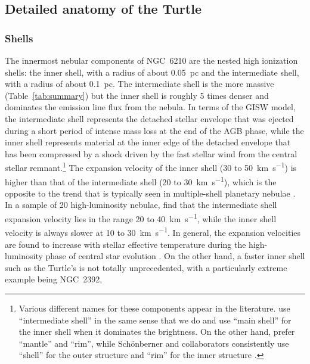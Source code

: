 \documentclass[useAMS, usenatbib]{mnras}
\begin{document}
\subsection{Detailed anatomy of the Turtle}
\label{sec:anatomy}

\subsubsection{Shells}
\label{sec:shells}


The innermost nebular components of NGC~6210 are the nested high ionization shells:
the inner shell, with a radius of about \SI{0.05}{pc}
and the intermediate shell, with a radius of about \SI{0.1}{pc}.
The intermediate shell is the more massive (Table~\ref{tab:summary})
but the inner shell is roughly 5 times denser and dominates the emission line flux from the nebula.
In terms of the GISW model, the intermediate shell represents the detached stellar envelope
that was ejected during a short period of intense mass loss at the end of the AGB phase,
while the inner shell represents material at the inner edge of the detached envelope
that has been compressed by a shock driven by the fast stellar wind from the central stellar remnant.\footnote{%
  Various different names for these components appear in the literature.
  \citet{Villaver:2002a} use ``intermediate shell'' in the same sense that we do
  and use ``main shell'' for the inner shell when it dominates the brightness.
  On the other hand, \citet{Balick:2002a} prefer ``mantle'' and ``rim'',
  while Schönberner and collaborators consistently use ``shell'' for the outer structure
  and ``rim'' for the inner structure
  \citep[e.g.,][]{Perinotto:2004a, Schonberner:2014a, Schonberner:2018a}.
}
The expansion velocity of the inner shell (\num{30} to \SI{50}{km.s^{-1}})
is higher than that of the intermediate shell (\num{20} to \SI{30}{km.s^{-1}}),
which is the opposite to the trend that is typically seen in multiple-shell planetary nebulae \citep{Corradi:2007a}.
In a sample of 20 high-luminosity nebulae, \citet{Schonberner:2014a} find that the intermediate shell expansion velocity lies in the range \num{20} to \SI{40}{km.s^{-1}},
while the inner shell velocity is always slower at \num{10} to \SI{30}{km.s^{-1}}.
In general, the expansion velocities are found to increase with stellar effective temperature
during the high-luminosity phase of central star evolution
\citep{Richer:2008a, Richer:2010a, Pereyra:2016a}.
On the other hand, a faster inner shell such as the Turtle's
is not totally unprecedented,
with a particularly extreme example being NGC~2392,
\end{document}
